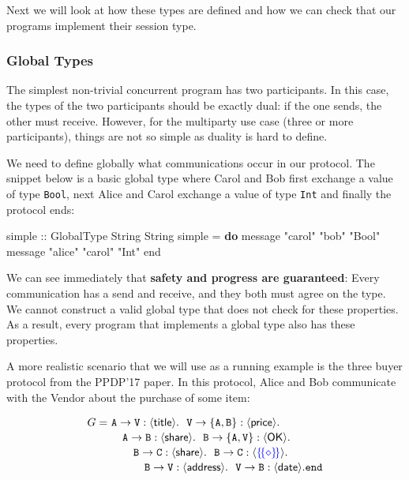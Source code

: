 \documentclass[runningheads,plain]{llncs}
\newenvironment{Shaded}{}{}
\newcommand{\KeywordTok}[1]{\textcolor[rgb]{0.00,0.44,0.13}{\textbf{#1}}}
\newcommand{\DataTypeTok}[1]{\textcolor[rgb]{0.56,0.13,0.00}{#1}}
\newcommand{\StringTok}[1]{\textcolor[rgb]{0.25,0.44,0.63}{#1}}
\newcommand{\OtherTok}[1]{\textcolor[rgb]{0.00,0.44,0.13}{#1}}
\newcommand{\FunctionTok}[1]{\textcolor[rgb]{0.02,0.16,0.49}{#1}}
\newcommand{\NormalTok}[1]{#1}
\begin{document}
Next we will look at how these types are defined and how we can check
that our programs implement their session type.

\subsubsection{Global Types}\label{global-types}

The simplest non-trivial concurrent program has two participants. In
this case, the types of the two participants should be exactly dual: if
the one sends, the other must receive. However, for the multiparty use
case (three or more participants), things are not so simple as duality
is hard to define.

We need to define globally what communications occur in our protocol.
The snippet below is a basic global type where Carol and Bob first
exchange a value of type \texttt{Bool}, next Alice and Carol exchange a
value of type \texttt{Int} and finally the protocol ends:

\begin{Shaded}
\begin{Highlighting}[]
\OtherTok{simple ::} \DataTypeTok{GlobalType} \DataTypeTok{String} \DataTypeTok{String}
\NormalTok{simple }\FunctionTok{=} \KeywordTok{do} 
\NormalTok{    message }\StringTok{"carol"} \StringTok{"bob"} \StringTok{"Bool"}
\NormalTok{    message }\StringTok{"alice"} \StringTok{"carol"} \StringTok{"Int"}
\NormalTok{    end}
\end{Highlighting}
\end{Shaded}

We can see immediately that \textbf{safety and progress are guaranteed}:
Every communication has a send and receive, and they both must agree on
the type. We cannot construct a valid global type that does not check
for these properties. As a result, every program that implements a
global type also has these properties.

A more realistic scenario that we will use as a running example is the
three buyer protocol from the PPDP'17 paper. In this protocol, Alice and
Bob communicate with the Vendor about the purchase of some item:

\begin{align*}
G = ~&  \mathtt{A}\to\mathtt{\texttt{V}}:\langle \mathsf{title}\rangle.~~\mathtt{\mathtt{V}}\to\mathtt{\{A,B\}}:\langle \mathsf{price}\rangle.\\[-0.5mm] 
& \quad\mathtt{A}\to\mathtt{B}:\langle \mathsf{share}\rangle.~~\mathtt{B}\to\mathtt{\{A,\mathtt{V}\}}:\langle \mathsf{OK}\rangle.
\\[-0.5mm]
& \quad\quad \mathtt{B}\to\mathtt{C}:\langle \mathsf{share}\rangle.~~\mathtt{B}\to\mathtt{C}:\langle \textcolor{blue}{\{\!\{\diamond\}\!\}}\rangle.
\\[-0.5mm]
& \quad\qquad \mathtt{B}\to\mathtt{\mathtt{V}}:\langle \mathsf{address}\rangle.~~\mathtt{\mathtt{V}}\to\mathtt{B}:\langle \mathsf{date}\rangle.\mathtt{end}
\end{align*}
\end{document}
